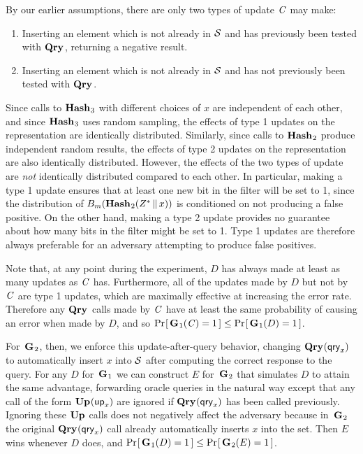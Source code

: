 By our earlier assumptions, there are only two types of update $\mathit{C}$ may make:
%
\begin{enumerate}
  \item Inserting an element which is not already in $\mathcal{S}$ and has previously been tested with $\textup{\textbf{Qry}}\hspace{0.5pt}$, returning a negative result.
  \item Inserting an element which is not already in $\mathcal{S}$ and has not previously been tested with $\textup{\textbf{Qry}}\hspace{0.5pt}$.
\end{enumerate}
Since calls to $\textup{\textbf{Hash}}\hspace{0.5pt}_3$ with different choices of $x$ are independent of each
other, and since $\textup{\textbf{Hash}}\hspace{0.5pt}_3$ uses random sampling, the effects of type 1 updates
on the representation are identically distributed. Similarly, since calls to
$\textup{\textbf{Hash}}\hspace{0.5pt}_2$ produce independent random results, the effects of type 2 updates on
the representation are also identically distributed. However, the effects of the
two types of update are \emph{not} identically distributed compared to each
other. In particular, making a type 1 update ensures that at least one new bit
in the filter will be set to 1, since the distribution of
${B}_m(\textup{\textbf{Hash}}\hspace{0.5pt}_2(Z^* \, \| \, x))$ is conditioned on not producing a false
positive. On the other hand, making a type 2 update provides no guarantee about
how many bits in the filter might be set to 1. Type 1 updates are therefore
always preferable for an adversary attempting to produce false positives.

Note that, at any point during the experiment, $D$ has always made at least as
many updates as $\mathit{C}$ has. Furthermore, all of the updates made by $D$ but not
by $\mathit{C}$ are type 1 updates, which are maximally effective at increasing the
error rate. Therefore any $\textup{\textbf{Qry}}\hspace{0.5pt}$ calls made by $\mathit{C}$ have at least the same
probability of causing an error when made by $D$, and so
$\Pr\hspace{-1pt}\left[\,\textup{\textbf{G}}\hspace{0.5pt}_1(\mathit{C}) = 1\,\right] \le \Pr\hspace{-1pt}\left[\,\textup{\textbf{G}}\hspace{0.5pt}_1(D) = 1\,\right]$.

For~$\textup{\textbf{G}}\hspace{0.5pt}_2$, then, we enforce this update-after-query behavior, changing
$\textup{\textbf{Qry}}\hspace{0.5pt}(\mathsf{qry}_x)$ to
automatically insert $x$ into $\mathcal{S}$ after computing the correct response to the
query. For any $D$ for~$\textup{\textbf{G}}\hspace{0.5pt}_1$ we can construct $E$ for~$\textup{\textbf{G}}\hspace{0.5pt}_2$ that
simulates $D$ to attain the same advantage, forwarding oracle queries in the
natural way except that any call of the form $\textup{\textbf{Up}}\hspace{0.5pt}(\mathsf{up}_x)$ are ignored if $\textup{\textbf{Qry}}\hspace{0.5pt}(\mathsf{qry}_x)$
has been called previously. Ignoring these $\textup{\textbf{Up}}\hspace{0.5pt}$ calls does not negatively
affect the adversary because in~$\textup{\textbf{G}}\hspace{0.5pt}_2$ the original $\textup{\textbf{Qry}}\hspace{0.5pt}(\mathsf{qry}_x)$ call
already automatically inserts $x$ into the set. Then $E$ wins whenever $D$ does, and
$\Pr\hspace{-1pt}\left[\,\textup{\textbf{G}}\hspace{0.5pt}_1(D) = 1\,\right] \le \Pr\hspace{-1pt}\left[\,\textup{\textbf{G}}\hspace{0.5pt}_2(E) = 1\,\right]$.

